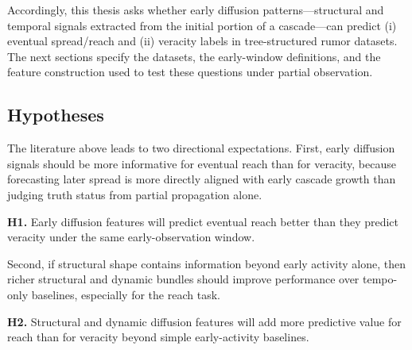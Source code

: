 Accordingly, this thesis asks whether early diffusion patterns---structural and temporal signals extracted from the initial portion of a cascade---can predict (i) eventual spread/reach and (ii) veracity labels in tree-structured rumor datasets. The next sections specify the datasets, the early-window definitions, and the feature construction used to test these questions under partial observation.

\subsection{Hypotheses}
The literature above leads to two directional expectations. First, early diffusion signals should be more informative for eventual reach than for veracity, because forecasting later spread is more directly aligned with early cascade growth than judging truth status from partial propagation alone.

\textbf{H1.} Early diffusion features will predict eventual reach better than they predict veracity under the same early-observation window.

Second, if structural shape contains information beyond early activity alone, then richer structural and dynamic bundles should improve performance over tempo-only baselines, especially for the reach task.

\textbf{H2.} Structural and dynamic diffusion features will add more predictive value for reach than for veracity beyond simple early-activity baselines.
